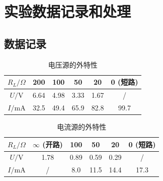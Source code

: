 \documentclass[10.5pt]{config}
\begin{document}
\section{实验数据记录和处理}
\subsection{数据记录}

\begin{table}[H]
    \centering
    \begin{tabular}{|c|c|c|c|c|c|}
        \hline
        $R_L/\Omega$ & 200 & 100 & 50 & 20 & 0 (短路) \\
        \hline
        $U/\mathrm{V}$ & 6.64 & 4.98 & 3.33 & 1.67 & / \\
        \hline
        $I/\mathrm{mA}$ & 32.5 & 49.4 & 65.9 & 82.8 & 99.7 \\
        \hline
    \end{tabular}
    \caption{电压源的外特性}
    \label{tab:voltage_source_characteristic}
\end{table}

\begin{table}[H]
    \centering
    \begin{tabular}{|c|c|c|c|c|c|}
        \hline
        $R_L/\Omega$ & $\infty$ (开路) & 100 & 50 & 20 & 0 (短路) \\
        \hline
        $U/\mathrm{V}$ & 1.78 & 0.89 & 0.59 & 0.29 & / \\
        \hline
        $I/\mathrm{mA}$ & / & 8.0 & 11.5 & 14.4 & 17.3 \\
        \hline
    \end{tabular}
    \caption{电流源的外特性}
    \label{tab:current_source_characteristic}
\end{table}


\begin{table}[H]
    \centering
    \caption{电路元件的伏安特性}
    \label{tab:diode_characteristic}
\end{table}
\end{document}
